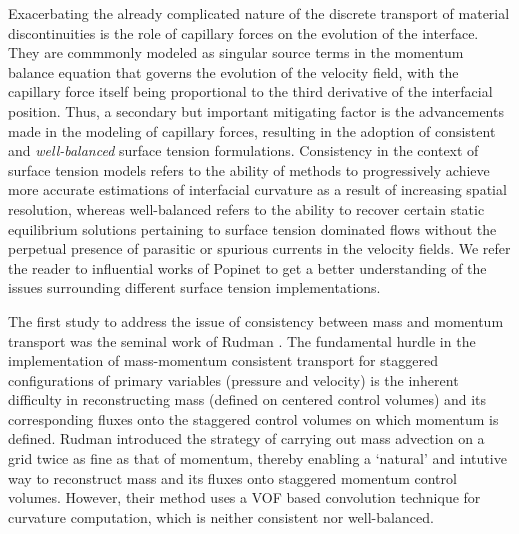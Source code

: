 
Exacerbating the already complicated nature of the discrete transport of material 
discontinuities is the role of capillary forces on the evolution of the interface. 
They are commmonly modeled as singular source terms in the momentum balance equation that 
governs the evolution of the velocity field, with the capillary force itself 
being proportional to the third derivative of the interfacial position. 
Thus, a secondary but important mitigating factor is the advancements 
made in the modeling of capillary forces, resulting in the adoption of 
consistent and \textit{well-balanced} surface tension formulations.
Consistency in the context of surface tension models refers to the ability 
of methods to progressively achieve more accurate estimations of interfacial 
curvature as a result of increasing spatial resolution, 
whereas well-balanced refers to the ability to recover certain static 
equilibrium solutions pertaining to surface tension dominated flows 
without the perpetual presence of parasitic or spurious currents in the velocity fields.
We refer the reader to influential works of Popinet \cite{popinet2018numerical,popinet2009accurate}
to get a better understanding of the issues surrounding different surface tension implementations.  




The first study to address the issue of consistency between mass 
and momentum transport was the seminal work of Rudman .
The fundamental hurdle in the implementation of mass-momentum 
consistent transport for staggered configurations of primary variables 
(pressure and velocity) is the inherent difficulty in reconstructing mass 
(defined on centered control volumes) and its corresponding fluxes 
onto the staggered control volumes on which momentum is defined. 
Rudman introduced the strategy of carrying out mass advection 
on a grid twice as fine as that of momentum, 
thereby enabling a `natural' and intutive 
way to reconstruct mass and its fluxes onto staggered momentum control volumes. 
However, their method uses a VOF based convolution technique for curvature computation, 
which is neither consistent nor well-balanced.    


